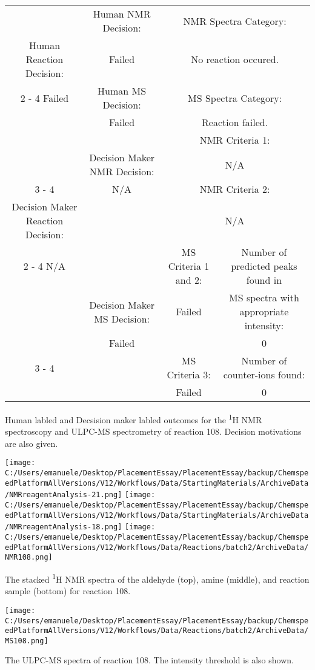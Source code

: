 \documentclass{article}%
\begin{document}
\begin{Decision Table}[H]%
\begin{tabular}{|c|c|c|c|}%
\hline%
&Human NMR Decision:&\multicolumn{2}{|c|}{NMR Spectra Category:}\\%
Human Reaction Decision:&Failed&\multicolumn{2}{|c|}{No reaction occured.}\\%
\cline{2%
-%
4}%
Failed&Human MS Decision:&\multicolumn{2}{|c|}{MS Spectra Category:}\\%
&Failed&\multicolumn{2}{|c|}{Reaction failed.}\\%
\hline%
&&\multicolumn{2}{|c|}{NMR Criteria 1:}\\%
&Decision Maker NMR Decision:&\multicolumn{2}{|c|}{N/A}\\%
\cline{3%
-%
4}%
&N/A&\multicolumn{2}{|c|}{NMR Criteria 2:}\\%
Decision Maker Reaction Decision:&&\multicolumn{2}{|c|}{N/A}\\%
\cline{2%
-%
4}%
N/A&&MS Criteria 1 and 2:&Number of predicted peaks found in\\%
&Decision Maker MS Decision:&Failed&MS spectra with appropriate intensity:\\%
&Failed&&0\\%
\cline{3%
-%
4}%
&&MS Criteria 3:&Number of counter{-}ions found:\\%
&&Failed&0\\%
\hline%
\end{tabular}%
\caption{Human labled and Decsision maker labled outcomes for the \textsuperscript{1}H NMR spectroscopy and ULPC-MS spectrometry of reaction 108. Decision motivations are also given.}%
\end{Decision Table}%
\begin{NMR Spectra}[H]%
\begin{center}%
\texttt{[image: C:/Users/emanuele/Desktop/PlacementEssay/PlacementEssay/backup/ChemspeedPlatformAllVersions/V12/Workflows/Data/StartingMaterials/ArchiveData/NMRreagentAnalysis-21.png]}\hfill%
\texttt{[image: C:/Users/emanuele/Desktop/PlacementEssay/PlacementEssay/backup/ChemspeedPlatformAllVersions/V12/Workflows/Data/StartingMaterials/ArchiveData/NMRreagentAnalysis-18.png]}\hfill%
\texttt{[image: C:/Users/emanuele/Desktop/PlacementEssay/PlacementEssay/backup/ChemspeedPlatformAllVersions/V12/Workflows/Data/Reactions/batch2/ArchiveData/NMR108.png]}\hfill%
\end{center}%
\caption{The stacked \textsuperscript{1}H NMR spectra of the aldehyde (top), amine (middle), and reaction sample (bottom) for reaction 108.}%
\end{NMR Spectra}%
\begin{MS Spectra}[H]%
\begin{center}%
\texttt{[image: C:/Users/emanuele/Desktop/PlacementEssay/PlacementEssay/backup/ChemspeedPlatformAllVersions/V12/Workflows/Data/Reactions/batch2/ArchiveData/MS108.png]}\hfill%
\end{center}%
\caption{The ULPC-MS spectra of reaction 108. The intensity threshold is also shown.}%
\end{MS Spectra}%
\end{document}
